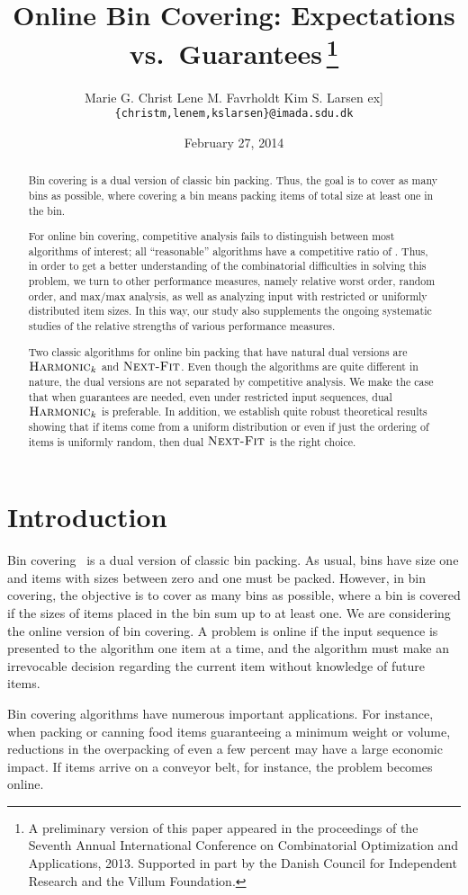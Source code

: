 \documentclass[11pt]{article}
\title{Online Bin Covering: Expectations vs.\ Guarantees\,\thanks{A
preliminary version of this paper appeared in the
proceedings of the Seventh Annual International Conference on
Combinatorial Optimization and Applications, 2013.
Supported in part by the Danish Council for Independent Research
and the Villum Foundation.}}
\author{Marie G. Christ \hspace{2em} Lene M. Favrholdt \hspace{2em} Kim S. Larsen \1ex]
        {\tt \{christm,lenem,kslarsen\}@imada.sdu.dk}}
\date{February 27, 2014}
\newcommand{\nextfit}{\ensuremath{\operatorname{\textsc{Next-Fit}}}\xspace}
\newcommand{\harm}{{\ensuremath{\textsc{Harmonic}_k}}\xspace}
\begin{document}
\maketitle

\begin{abstract}
Bin covering is a dual version of classic bin packing.
Thus, the goal is to cover as many bins as possible, where covering a bin
means packing items of total size at least one in the bin.


For online bin covering, competitive analysis fails to distinguish between
most algorithms of interest; 
all ``reasonable'' algorithms have a competitive ratio of .
Thus,
 in order to get a better understanding of the combinatorial difficulties in solving this problem,
 we turn to other
performance measures, namely relative worst order, random order, and
max/max analysis, as well as
analyzing input with restricted or uniformly distributed item sizes.
In this way, our study also supplements the ongoing systematic studies of
the relative strengths of various performance measures.

Two classic algorithms for online bin packing that have natural dual
 versions are \harm and \nextfit. 
Even though the algorithms are quite different in nature, 
the dual versions are
 not separated by competitive analysis.
We make the case that when guarantees are needed, even under restricted
input sequences, dual \harm is preferable. In addition, we
establish quite robust theoretical results showing that if items come
from a uniform distribution or even if just the ordering of items is uniformly
random, then dual \nextfit is the right choice.
\end{abstract}

\section{Introduction}
Bin covering~\cite{AJKL84j} is a dual version of classic bin packing.
As usual, bins have
size one and items with sizes between zero and one must be packed. However,
in bin covering, the objective is to cover as many bins as possible,
where a bin is covered if the sizes of items placed in the bin sum up
to at least one.
We are considering the online version of bin covering. A problem
is online if the input sequence is presented to the algorithm one item
at a time, and the algorithm must make an irrevocable decision regarding
the current item without knowledge of future items.

Bin covering algorithms have numerous important applications.
For instance, when packing or canning food items guaranteeing a
minimum weight or volume, reductions in the overpacking of even a
few percent may have a large economic impact.
If items arrive on a conveyor belt, for instance, the problem becomes online.
\end{document}
